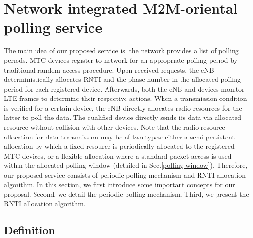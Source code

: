 \section{Network integrated M2M-oriental polling service}
\label{sec:polling}
The main idea of our proposed service is: the network provides a list of polling periods. MTC devices register to network for an appropriate polling period by traditional random access procedure. 
Upon received requests, the eNB deterministically allocates RNTI and the phase number in the allocated polling period for each registered device.
Afterwards, both the eNB and devices monitor LTE frames to determine their respective actions. When a transmission condition is verified for a certain device, the eNB directly allocates radio resources for the latter to poll the data. The qualified device directly sends its data via allocated resource without collision with other devices. Note that the radio resource allocation for data transmission may be of two types: either a semi-persistent allocation by which a fixed resource is periodically allocated to the registered MTC devices, or a flexible allocation where a standard packet access is used within the allocated polling window (detailed in Sec.\ref{polling-window}). 
Therefore, our proposed service consists of periodic polling mechanism and RNTI allocation algorithm. 
In this section, we first introduce some important concepts for our proposal. Second, we detail the periodic polling mechanism. Third, we present the RNTI allocation algorithm. 
\subsection{Definition}

